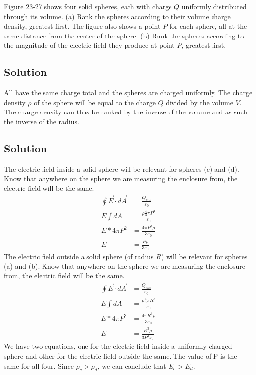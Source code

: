 \documentclass[12pt]{article}
\begin{document}
Figure 23-27 shows four solid spheres, each with charge $Q$ uniformly distributed through its volume. (a) Rank the spheres according to their volume charge density, greatest first. The figure also shows a point $P$ for each sphere, all at the same distance from the center of the sphere. (b) Rank the spheres according to the magnitude of the electric field they produce at point $P$, greatest first.

\subsection{Solution}
All have the same charge total and the spheres are charged uniformly. 
The charge density \(\rho\) of the sphere will be equal to the charge $Q$ divided by the volume $V$. 
The charge density can thus be ranked by the inverse of the volume and as such the inverse of the radius.

\subsection{Solution}
The electric field inside a solid sphere will be relevant for spheres (c) and (d). Know that anywhere on the sphere we are measuring the enclosure from, the electric field will be the same.
\begin{align*}
    \oint \vec{E} \cdot d\vec{A}    &=  \frac{Q_{enc}}{\varepsilon_0}\\
    E \int dA  &=  \frac{\rho \frac{4}{3}\pi P^3}{\varepsilon_0}\\
    E * 4\pi P^2    &=  \frac{4\pi P^3 \rho}{3 \varepsilon_0}\\
    E   &=  \frac{P \rho}{3 \varepsilon_0}
\end{align*}
The electric field outside a solid sphere (of radius $R$) will be relevant for spheres (a) and (b). Know that anywhere on the sphere we are measuring the enclosure from, the electric field will be the same.
\begin{align*}
    \oint \vec{E} \cdot d\vec{A}    &=  \frac{Q_{enc}}{\varepsilon_0}\\
    E \int dA   &=  \frac{\rho \frac{4}{3}\pi R^3}{\varepsilon_0}\\
    E * 4\pi P^2    &=  \frac{4\pi R^3 \rho}{3\varepsilon_0}\\
    E   &=  \frac{R^3 \rho}{3 P^2 \varepsilon_0}
\end{align*}
We have two equations, one for the electric field inside a uniformly charged sphere and other for the electric field outside the same. 
The value of P is the same for all four.
Since $\rho_c > \rho_d$, we can conclude that $E_c > E_d$.
\end{document}
